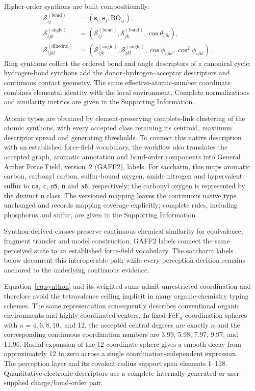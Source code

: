 \documentclass[journal=jctcce,manuscript=article]{achemso}
\begin{document}
Higher-order synthons are built compositionally:
\begin{align}
\mathcal S_{ij}^{(\mathrm{bond})}
  &=\left(\mathbf s_i,\mathbf s_j,\mathrm{BO}_{ij}\right),\\
\mathcal S_{ijk}^{(\mathrm{angle})}
  &=\left(\mathcal S_{ij}^{(\mathrm{bond})},
           \mathcal S_{jk}^{(\mathrm{bond})},\cos\theta_{ijk}\right),\\
\mathcal S_{ijkl}^{(\mathrm{dihedral})}
  &=\left(\mathcal S_{ijk}^{(\mathrm{angle})},
           \mathcal S_{jkl}^{(\mathrm{angle})},
           \cos\phi_{ijkl},\cos^2\phi_{ijkl}\right).
\end{align}
Ring synthons collect the ordered bond and angle descriptors of a canonical
cycle; hydrogen-bond synthons add the donor--hydrogen--acceptor descriptors
and continuous contact geometry.  The same effective-atomic-number coordinate
combines elemental identity with the local environment.  Complete
normalizations and similarity metrics
are given in the Supporting Information.

Atomic types are obtained by element-preserving complete-link clustering of
the atomic synthons, with every accepted class retaining its centroid,
maximum descriptor spread and generating thresholds.  To connect this native
description with an established force-field vocabulary, the workflow also
translates the accepted graph, aromatic annotation and bond-order components
into General Amber Force Field, version~2 (GAFF2), labels.\cite{gaff_2004}
For saccharin, this maps aromatic carbon, carbonyl carbon, sulfur-bound oxygen,
amide nitrogen and hypervalent sulfur to \texttt{ca}, \texttt{c}, \texttt{o5},
\texttt{n} and \texttt{s6}, respectively; the carbonyl oxygen is represented by
the distinct \texttt{o} class.  The
versioned mapping leaves the continuous native type unchanged and records
mapping coverage explicitly; complete rules, including phosphorus and sulfur,
are given in the Supporting Information.

Synthon-derived classes preserve continuous chemical similarity for
equivalence, fragment transfer and model construction.  GAFF2 labels connect
the same perceived state to an established force-field vocabulary.  The
saccharin labels below document this interoperable path while every
perception decision remains anchored to the underlying continuous evidence.

Equation~\ref{eq:synthon} and its weighted sums admit unrestricted
coordination and therefore avoid the tetravalence ceiling implicit in many
organic-chemistry typing schemes.  The same representation consequently
describes conventional organic environments and highly coordinated centers.
In fixed FeF$_n$
coordination spheres with $n=4,6,8,10,$ and 12, the accepted central degrees
are exactly $n$ and the corresponding continuous coordination numbers are
3.99, 5.98, 7.97, 9.97, and 11.96.  Radial expansion of the 12-coordinate
sphere gives a smooth decay from approximately 12 to zero across a single
coordination-independent expression.  The perception layer and its
covalent-radius support span elements 1--118.  Quantitative electronic
descriptors use a complete internally generated or user-supplied
charge/bond-order pair.
\end{document}
